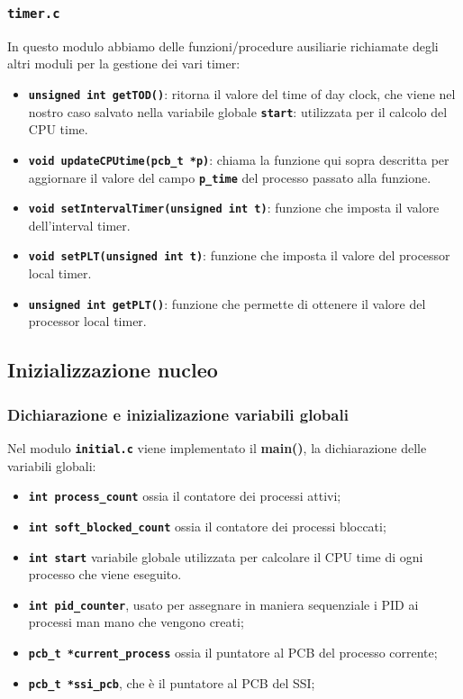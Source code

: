 \documentclass{article}
\begin{document}
\subsubsection{\texttt{\textbf{timer.c}}}
In questo modulo abbiamo delle funzioni/procedure ausiliarie richiamate degli altri moduli per la gestione dei vari timer:
\begin{itemize}
  \item \texttt{\textbf{unsigned int getTOD()}}: ritorna il valore del time of day clock, che viene nel nostro caso salvato nella variabile globale \texttt{\textbf{start}}: utilizzata per il calcolo del CPU time.
    \item \texttt{\textbf{void updateCPUtime(pcb\_t *p)}}: chiama la funzione qui sopra descritta per aggiornare il valore 
      del campo \texttt{\textbf{p\_time}} del processo passato alla funzione.
    \item \texttt{\textbf{void setIntervalTimer(unsigned int t)}}: funzione che imposta il valore dell'interval timer. 
    \item \texttt{\textbf{void setPLT(unsigned int t)}}: funzione che imposta il valore del processor local timer.
    \item \texttt{\textbf{unsigned int getPLT()}}: funzione che permette di ottenere il valore del processor local timer.
\end{itemize}

\subsection{Inizializzazione nucleo}
\subsubsection{Dichiarazione e inizializazione variabili globali}
Nel modulo \texttt{\textbf{initial.c}} viene implementato il \textbf{main()}, la dichiarazione delle variabili globali:
\begin{itemize}
    \item \texttt{\textbf{int process\_count}} ossia il contatore dei processi attivi;
    \item \texttt{\textbf{int soft\_blocked\_count}} ossia il contatore dei processi bloccati;
    \item \texttt{\textbf{int start}} variabile globale utilizzata per calcolare il CPU time di ogni processo che viene eseguito.
    \item \texttt{\textbf{int pid\_counter}}, usato per assegnare in maniera sequenziale i PID ai processi man mano che vengono creati;
    \item \texttt{\textbf{pcb\_t *current\_process}} ossia il puntatore al PCB del processo corrente;
    \item \texttt{\textbf{pcb\_t *ssi\_pcb}}, che è il puntatore al PCB del SSI;
    
\end{itemize}
\end{document}
